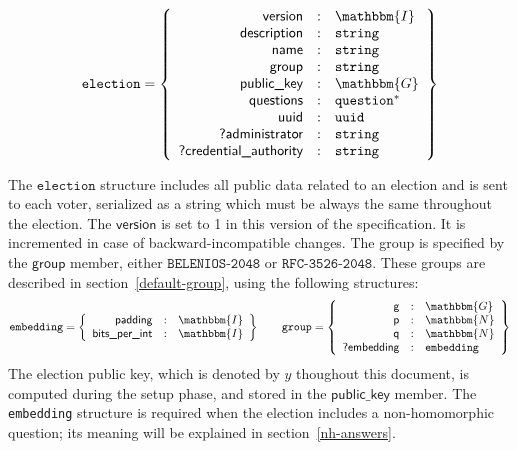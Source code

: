 \documentclass[a4paper]{article}
\newcommand{\G}{\mathbbm{G}}
\newcommand{\N}{\mathbbm{N}}
\newcommand{\I}{\mathbbm{I}}
\newcommand{\jstring}{\texttt{string}}
\newcommand{\election}{\texttt{election}}
\begin{document}
\begin{gather*}
  \election=\left\{
    \begin{array}{rcl}
      \textsf{version}&:&\I\\
      \textsf{description}&:&\jstring\\
      \textsf{name}&:&\jstring\\
      \textsf{group}&:&\jstring\\
      \textsf{public\_key}&:&\G\\
      \textsf{questions}&:&\texttt{question}^\ast\\
      \textsf{uuid}&:&\texttt{uuid}\\
      \textsf{?administrator}&:&\jstring\\
      \textsf{?credential\_authority}&:&\jstring
    \end{array}
  \right\}
\end{gather*}

The $\election$ structure includes all public data related to an
election and is sent to each voter, serialized as a string which must
be always the same throughout the election. The $\textsf{version}$ is
set to 1 in this version of the specification. It is incremented in
case of backward-incompatible changes. The group is specified by the
$\textsf{group}$ member, either $\texttt{BELENIOS-2048}$ or
$\texttt{RFC-3526-2048}$. These groups are described in
section~\ref{default-group}, using the following structures:
\begin{gather*}
  \texttt{embedding}=\left\{
    \begin{array}{rcl}
      \textsf{padding}&:&\I\\
      \textsf{bits\_per\_int}&:&\I
    \end{array}
  \right\}
  \qquad
  \texttt{group}=\left\{
    \begin{array}{rcl}
      \textsf{g}&:&\G\\
      \textsf{p}&:&\N\\
      \textsf{q}&:&\N\\
      \textsf{?embedding}&:&\texttt{embedding}
    \end{array}
  \right\}
\end{gather*}
The election public key, which is denoted by $y$ thoughout this
document, is computed during the setup phase, and stored in the
$\textsf{public\_key}$ member. The \texttt{embedding} structure is
required when the election includes a non-homomorphic question; its
meaning will be explained in section~\ref{nh-answers}.
\end{document}
